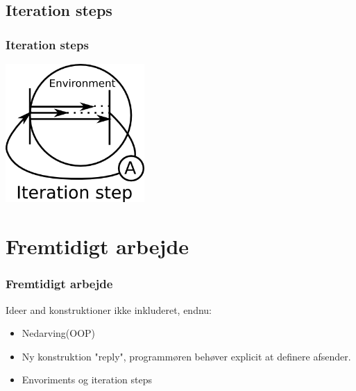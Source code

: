 \subsection{Iteration steps}
\begin{frame}
  \frametitle{Iteration steps}
  \includegraphics[width=200px]{Images/iteration.png}
\end{frame}

\section{Fremtidigt arbejde}
\begin{frame}
	\frametitle{Fremtidigt arbejde}
	Ideer and konstruktioner ikke inkluderet, endnu: 
  \begin{itemize}
    \item Nedarving(OOP)
    \item Ny konstruktion "reply", programmøren behøver explicit at definere afsender.
    \item Envoriments og iteration steps
  \end{itemize}
\end{frame}
